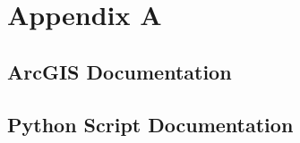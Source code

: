 \chapter{Appendix A}\label{app:a}

\section{ArcGIS Documentation}

\section{Python Script Documentation}
